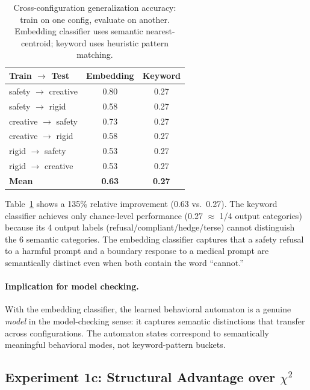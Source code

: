 \documentclass[11pt]{article}
\begin{document}
\begin{table}[t]
\centering
\caption{Cross-configuration generalization accuracy: train on one
  config, evaluate on another.  Embedding classifier uses semantic
  nearest-centroid; keyword uses heuristic pattern matching.}
\label{tab:embedding-cross-config}
\small
\begin{tabular}{@{}lcc@{}}
\toprule
\textbf{Train $\to$ Test} & \textbf{Embedding} & \textbf{Keyword} \\
\midrule
safety $\to$ creative   & 0.80 & 0.27 \\
safety $\to$ rigid      & 0.58 & 0.27 \\
creative $\to$ safety   & 0.73 & 0.27 \\
creative $\to$ rigid    & 0.58 & 0.27 \\
rigid $\to$ safety      & 0.53 & 0.27 \\
rigid $\to$ creative    & 0.53 & 0.27 \\
\midrule
\textbf{Mean}           & \textbf{0.63} & \textbf{0.27} \\
\bottomrule
\end{tabular}
\end{table}

Table~\ref{tab:embedding-cross-config} shows a 135\% relative
improvement (0.63 vs.\ 0.27).  The keyword classifier achieves only
chance-level performance (0.27 $\approx$ 1/4 output categories)
because its 4 output labels (refusal/compliant/hedge/terse) cannot
distinguish the 6 semantic categories.  The embedding classifier
captures that a safety refusal to a harmful prompt and a boundary
response to a medical prompt are semantically distinct even when
both contain the word ``cannot.''

\paragraph{Implication for model checking.}
With the embedding classifier, the learned behavioral automaton is
a genuine \emph{model} in the model-checking sense: it captures
semantic distinctions that transfer across configurations.
The automaton states correspond to semantically meaningful behavioral
modes, not keyword-pattern buckets.

\subsection{Experiment 1c: Structural Advantage over $\chi^2$}\label{sec:structural-advantage}
\end{document}
